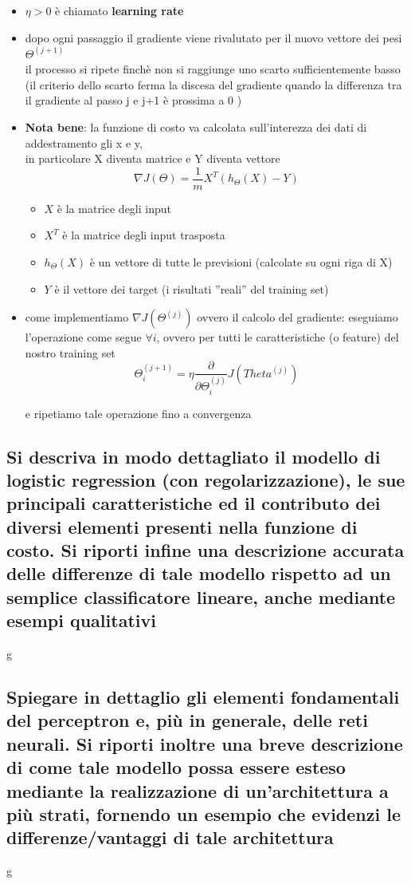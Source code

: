 \documentclass[10pt,oneside,a4paper]{article}
\begin{document}
\begin{itemize}
\begin{itemize}
\item $\eta > 0$ è chiamato \textbf{learning rate}
\item dopo ogni passaggio il gradiente viene rivalutato per il nuovo vettore dei pesi $\Theta^{(j+1)}$ 
\\ il processo si ripete finchè non si raggiunge uno scarto sufficientemente basso (il criterio dello scarto ferma la discesa del gradiente quando la differenza tra il gradiente al passo j e j+1 è prossima a 0 )

\item  \textbf{Nota bene}: la funzione di costo va calcolata sull'interezza dei dati di addestramento gli x e y, \\
in particolare X diventa matrice e Y diventa vettore
$$\nabla J(\Theta)=\frac{1}{m}X^{T}(h_{\Theta}(X)-Y)$$
 \begin{itemize}
\item $X$ è la matrice degli input
\item $X^{T}$ è la matrice degli input trasposta
\item $h_{\Theta}(X)$ è un vettore di tutte le previsioni (calcolate su ogni riga di X)
\item $Y$ è il vettore dei target (i risultati ''reali'' del training set)

\end{itemize}
\item come implementiamo $\nabla J(\Theta^{(j)})$ ovvero il calcolo del gradiente:
eseguiamo l'operazione come segue $\forall i$, ovvero per tutti le caratteristiche (o feature) del nostro training set
$$\Theta^{(j+1)}_{i}=\eta \frac{\partial}{\partial \Theta^{(j)}_{i}} J(Theta^{(j)})$$
 
e ripetiamo tale operazione fino a convergenza

\end{itemize}

\end{itemize}
\subsection{Si descriva in modo dettagliato il modello di logistic regression (con regolarizzazione), le
	sue principali caratteristiche ed il contributo dei diversi elementi presenti nella funzione
	di costo. Si riporti infine una descrizione accurata delle differenze di tale modello rispetto
	ad un semplice classificatore lineare, anche mediante esempi qualitativi}
g
\subsection{Spiegare in dettaglio gli elementi fondamentali del perceptron e, più in generale, delle reti
	neurali. Si riporti inoltre una breve descrizione di come tale modello possa essere esteso
	mediante la realizzazione di un’architettura a più strati, fornendo un esempio che evidenzi
	le differenze/vantaggi di tale architettura}
g
\end{document}
